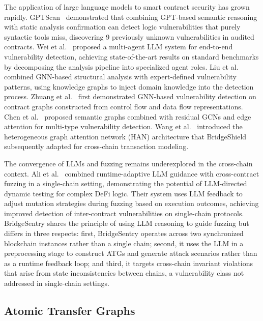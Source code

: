\documentclass[journal]{IEEEtran}
\begin{document}
The application of large language models to smart contract security has grown rapidly. GPTScan~\cite{sun2024gptscan} demonstrated that combining GPT-based semantic reasoning with static analysis confirmation can detect logic vulnerabilities that purely syntactic tools miss, discovering 9 previously unknown vulnerabilities in audited contracts. Wei et al.~\cite{wei2025llm} proposed a multi-agent LLM system for end-to-end vulnerability detection, achieving state-of-the-art results on standard benchmarks by decomposing the analysis pipeline into specialized agent roles. Liu et al.~\cite{liu2023gnn} combined GNN-based structural analysis with expert-defined vulnerability patterns, using knowledge graphs to inject domain knowledge into the detection process. Zhuang et al.~\cite{zhuang2021gnn} first demonstrated GNN-based vulnerability detection on contract graphs constructed from control flow and data flow representations. Chen et al.~\cite{chen2023semantic} proposed semantic graphs combined with residual GCNs and edge attention for multi-type vulnerability detection. Wang et al.~\cite{wang2019han} introduced the heterogeneous graph attention network (HAN) architecture that BridgeShield subsequently adapted for cross-chain transaction modeling.

The convergence of LLMs and fuzzing remains underexplored in the cross-chain context. Ali et al.~\cite{ali2025crossguard} combined runtime-adaptive LLM guidance with cross-contract fuzzing in a single-chain setting, demonstrating the potential of LLM-directed dynamic testing for complex DeFi logic. Their system uses LLM feedback to adjust mutation strategies during fuzzing based on execution outcomes, achieving improved detection of inter-contract vulnerabilities on single-chain protocols. BridgeSentry shares the principle of using LLM reasoning to guide fuzzing but differs in three respects: first, BridgeSentry operates across two synchronized blockchain instances rather than a single chain; second, it uses the LLM in a preprocessing stage to construct ATGs and generate attack scenarios rather than as a runtime feedback loop; and third, it targets cross-chain invariant violations that arise from state inconsistencies between chains, a vulnerability class not addressed in single-chain settings.

\subsection{Atomic Transfer Graphs}
\end{document}
